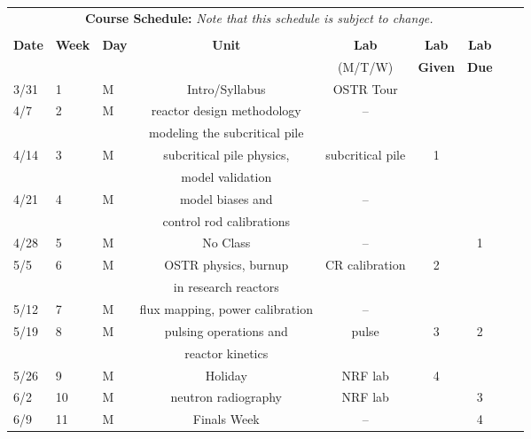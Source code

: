 \documentclass[11pt, a4paper]{article}
\begin{document}
\pagebreak
\FloatBarrier
\renewcommand{\arraystretch}{1}
\begin{table}[h]
\begin{center}
\begin{tabular}{lllcccccc}
\multicolumn{8}{c}{\textbf{Course Schedule:}\textit{ Note that this schedule is
subject to change.}}\\
&&&&&&&&\\
\textbf{Date} & \textbf{Week} & \textbf{Day} & \textbf{Unit} & \textbf{Lab} & \textbf{Lab}& \textbf{Lab} \\
              &  &  &  & (M/T/W)  & \textbf{Given} & \textbf{Due}\\ \hline
\hline
3/31 & 1 & M & Intro/Syllabus  & OSTR Tour &  &   \\
4/7 & 2 & M & reactor design methodology\/ & -- &  &  \\
 & & & modeling the subcritical pile & & & \\
4/14 & 3 & M & subcritical pile physics,& subcritical pile & 1 & \\
 & & & model validation & & & \\
4/21 & 4 & M & model biases and    & -- &  &  \\
 & & & control rod calibrations & & & \\
4/28 & 5 & M & No Class                & -- &  & 1 \\
5/5 & 6 & M & OSTR physics, burnup        & CR calibration & 2  &  \\
 & & & in research reactors & & & \\
5/12 & 7 & M & flux mapping, power calibration & -- &  &  \\
5/19 & 8 & M & pulsing operations and        & pulse & 3  & 2 \\
 & & & reactor kinetics & & & \\
5/26 & 9 & M & Holiday                    & NRF lab & 4 &  \\
6/2 & 10 & M & neutron radiography        & NRF lab &  & 3\\
6/9 & 11 & M & Finals Week                & --  &  & 4  \\
\end{tabular}
\end{center}
\end{table}
\FloatBarrier



\end{document}

